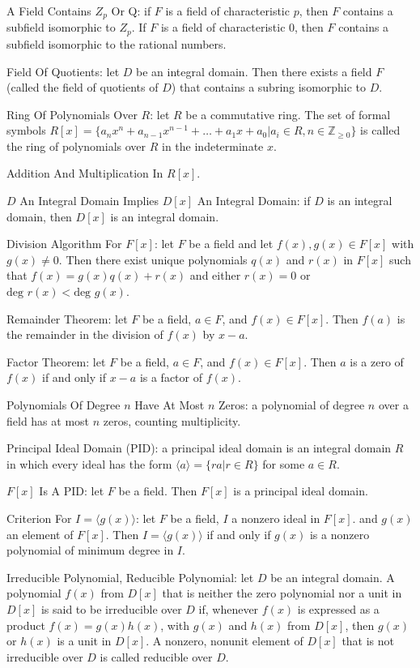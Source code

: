 A Field Contains $Z_p$ Or Q: if $F$ is a field of characteristic $p$, then $F$ contains a subfield isomorphic to $Z_p$. If $F$ is a field of characteristic $0$, then $F$ contains a subfield isomorphic to the rational numbers.

Field Of Quotients: let $D$ be an integral domain. Then there exists a field $F$ (called the field of quotients of $D$) that contains a subring isomorphic to $D$.

Ring Of Polynomials Over $R$: let $R$ be a commutative ring. The set of formal symbols $R[x] = \{a_n x^n + a_{n-1} x^{n-1} + \dots + a_1 x + a_0 | a_i \in R, n \in \mathbb{Z}_{\ge 0} \}$ is called the ring of polynomials over $R$ in the indeterminate $x$.

Addition And Multiplication In $R[x]$.

$D$ An Integral Domain Implies $D[x]$ An Integral Domain: if $D$ is an integral domain, then $D[x]$ is an integral domain.

Division Algorithm For $F[x]$: let $F$ be a field and let $f(x),g(x) \in F[x]$ with $g(x) \neq 0$. Then there exist unique polynomials $q(x)$ and $r(x)$ in $F[x]$ such that $f(x)=g(x)q(x)+r(x)$ and either $r(x)=0$ or $\text{deg }r(x) < \text{deg }g(x)$.

Remainder Theorem: let $F$ be a field, $a \in F$, and $f(x) \in F[x]$. Then $f(a)$ is the remainder in the division of $f(x)$ by $x-a$.

Factor Theorem: let $F$ be a field, $a \in F$, and $f(x) \in F[x]$. Then $a$ is a zero of $f(x)$ if and only if $x-a$ is a factor of $f(x)$.

Polynomials Of Degree $n$ Have At Most $n$ Zeros: a polynomial of degree $n$ over a field has at most $n$ zeros, counting multiplicity.

Principal Ideal Domain (PID): a principal ideal domain is an integral domain $R$ in which every ideal has the form $\langle a \rangle = \{ ra | r \in R \}$ for some $a \in R$.

$F[x]$ Is A PID: let $F$ be a field. Then $F[x]$ is a principal ideal domain.

Criterion For $I = \langle g(x) \rangle$: let $F$ be a field, $I$ a nonzero ideal in $F[x]$. and $g(x)$ an element of $F[x]$. Then $I = \langle g(x) \rangle$ if and only if $g(x)$ is a nonzero polynomial of minimum degree in $I$.

Irreducible Polynomial, Reducible Polynomial: let $D$ be an integral domain. A polynomial $f(x)$ from $D[x]$ that is neither the zero polynomial nor a unit in $D[x]$ is said to be irreducible over $D$ if, whenever $f(x)$ is expressed as a product $f(x)=g(x)h(x)$, with $g(x)$ and $h(x)$ from $D[x]$, then $g(x)$ or $h(x)$ is a unit in $D[x]$. A nonzero, nonunit element of $D[x]$ that is not irreducible over $D$ is called reducible over $D$.

